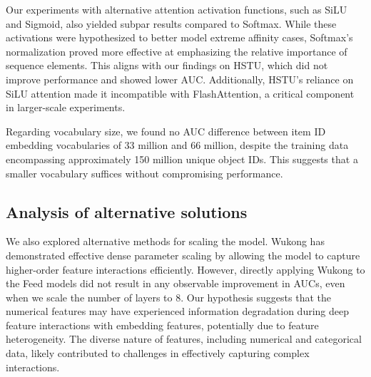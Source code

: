 Our experiments with alternative attention activation functions, such as SiLU and Sigmoid, also yielded subpar results compared to Softmax. While these activations were hypothesized to better model extreme affinity cases, Softmax's normalization proved more effective at emphasizing the relative importance of sequence elements. This aligns with our findings on HSTU, which did not improve performance and showed lower AUC. Additionally, HSTU's reliance on SiLU attention made it incompatible with FlashAttention, a critical component in larger-scale experiments.

Regarding vocabulary size, we found no AUC difference between item ID embedding vocabularies of 33 million and 66 million, despite the training data encompassing approximately 150 million unique object IDs. This suggests that a smaller vocabulary suffices without compromising performance.


\subsection{Analysis of alternative solutions}\label{wukong_layer}
We also explored alternative methods for scaling the model. Wukong \cite{zhang2024wukongscalinglawlargescale} has demonstrated effective dense parameter scaling by allowing the model to capture higher-order feature interactions efficiently. However, directly applying Wukong to the Feed models did not result in any observable improvement in AUCs, even when we scale the number of layers to 8. Our hypothesis suggests that the numerical features may have experienced information degradation during deep feature interactions with embedding features, potentially due to feature heterogeneity. The diverse nature of features, including numerical and categorical data, likely contributed to challenges in effectively capturing complex interactions. 

